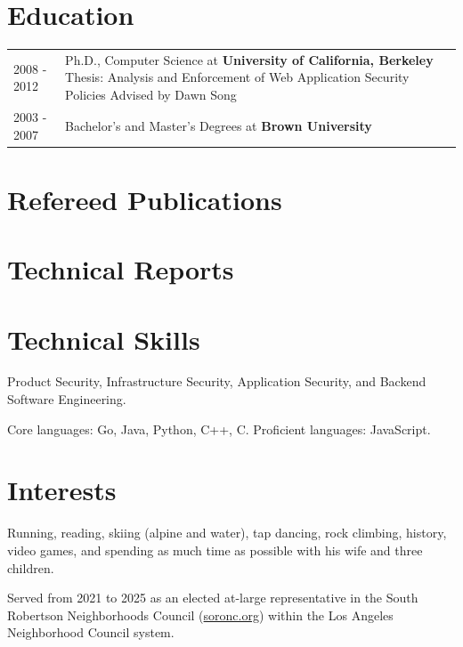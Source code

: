 \documentclass[a4paper,12pt]{article}
\begin{document}
\section{Education}
\begin{tabularx}{\linewidth}{@{}l X@{}}
2008 - 2012 & Ph.D., Computer Science at \textbf{University of California, Berkeley} \newline Thesis: Analysis and Enforcement of Web Application Security Policies \newline Advised by Dawn Song \\

2003 - 2007 & Bachelor's and Master's Degrees at \textbf{Brown University} \\ 

\end{tabularx}

\section{Refereed Publications}
\begin{refsection}
\nocite{*}
\printbibliography[heading=none]
\end{refsection}

\section{Technical Reports}
\begin{refsection}
\nocite{*}
\printbibliography[heading=none]
\end{refsection}


\section{Technical Skills}
Product Security, Infrastructure Security, Application Security, and Backend Software Engineering.

Core languages: Go, Java, Python, C++, C. Proficient languages: JavaScript.

\section{Interests}
Running, reading, skiing (alpine and water), tap dancing, rock climbing, history, video games, and spending as much time as possible with his wife and three children.

Served from 2021 to 2025 as an elected at-large representative in the South Robertson Neighborhoods Council (\href{https://www.soronc.org}{soronc.org}) within the Los Angeles Neighborhood Council system.
\end{document}
